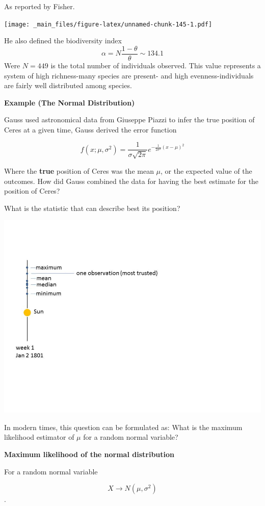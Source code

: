 \documentclass[
]{book}
\begin{document}
As reported by Fisher.

\texttt{[image: \_main\_files/figure-latex/unnamed-chunk-145-1.pdf]}

He also defined the biodiversity index \[\alpha=N \frac{1-\theta}{\theta}\sim 134.1\]
Were \(N=449\) is the total number of individuals observed. This value represents a system of high richness-many species are present- and high evenness-individuals are fairly well distributed among species.

\textbf{Example (The Normal Distribution)}

Gauss used astronomical data from Giuseppe Piazzi to infer the true position of Ceres at a given time, Gauss derived the error function

\[f(x; \mu, \sigma^2)= \frac{1}{\sigma \sqrt{2 \pi}} e^{-\frac{1}{2\sigma^2} (x-\mu)^2}\]

Where the \textbf{true} position of Ceres was the mean \(\mu\), or the expected value of the outcomes. How did Gauss combined the data for having the best estimate for the position of Ceres?

What is the statistic that can describe best its position?

\includegraphics{./figures/cerestime.JPG}

In modern times, this question can be formulated as: What is the maximum likelihood estimator of \(\mu\) for a random normal variable?

\textbf{Maximum likelihood of the normal distribution}

For a random normal variable

\[X \rightarrow N(\mu, \sigma^2)\].
\end{document}
